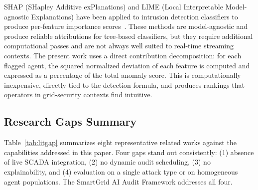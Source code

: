 SHAP (SHapley Additive exPlanations) and LIME (Local Interpretable Model-agnostic Explanations)
have been applied to intrusion detection classifiers to produce per-feature importance
scores~\cite{arrieta2020explainable}. These methods are model-agnostic and produce reliable
attributions for tree-based classifiers, but they require additional computational passes and are
not always well suited to real-time streaming contexts. The present work uses a direct contribution
decomposition: for each flagged agent, the squared normalized deviation of each feature is computed
and expressed as a percentage of the total anomaly score. This is computationally inexpensive,
directly tied to the detection formula, and produces rankings that operators in grid-security
contexts find intuitive.

\subsection{Research Gaps Summary}

Table~\ref{tab:litgap} summarizes eight representative related works against the capabilities
addressed in this paper. Four gaps stand out consistently: (1) absence of live SCADA integration,
(2) no dynamic audit scheduling, (3) no explainability, and (4) evaluation on a single attack type
or on homogeneous agent populations. The SmartGrid AI Audit Framework addresses all four.

